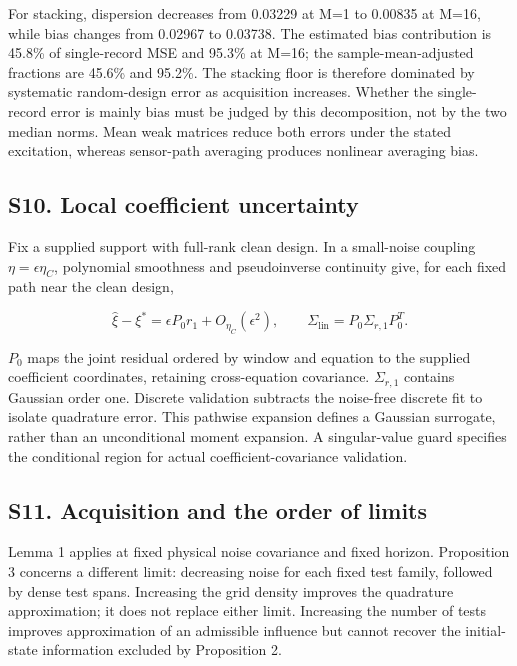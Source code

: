 \documentclass[
  american,
  11pt,
]{article}
\begin{document}
For stacking, dispersion decreases from 0.03229 at M=1 to 0.00835 at
M=16, while bias changes from 0.02967 to 0.03738. The estimated bias
contribution is 45.8\% of single-record MSE and 95.3\% at M=16; the
sample-mean-adjusted fractions are 45.6\% and 95.2\%. The stacking floor
is therefore dominated by systematic random-design error as acquisition
increases. Whether the single-record error is mainly bias must be judged
by this decomposition, not by the two median norms. Mean weak matrices
reduce both errors under the stated excitation, whereas sensor-path
averaging produces nonlinear averaging bias.

\subsection{S10. Local coefficient
uncertainty}\label{s10.-local-coefficient-uncertainty}

Fix a supplied support with full-rank clean design. In a small-noise
coupling \(\eta=\epsilon\eta_C\), polynomial smoothness and
pseudoinverse continuity give, for each fixed path near the clean
design,

\[
\widehat\xi-\xi^*=\epsilon P_0r_1+O_{\eta_C}(\epsilon^2),\qquad
\Sigma_{\mathrm{lin}}=P_0\Sigma_{r,1}P_0^T.
\]

\(P_0\) maps the joint residual ordered by window and equation to the
supplied coefficient coordinates, retaining cross-equation covariance.
\(\Sigma_{r,1}\) contains Gaussian order one. Discrete validation
subtracts the noise-free discrete fit to isolate quadrature error. This
pathwise expansion defines a Gaussian surrogate, rather than an
unconditional moment expansion. A singular-value guard specifies the
conditional region for actual coefficient-covariance validation.

\subsection{S11. Acquisition and the order of
limits}\label{s11.-acquisition-and-the-order-of-limits}

Lemma 1 applies at fixed physical noise covariance and fixed horizon.
Proposition 3 concerns a different limit: decreasing noise for each
fixed test family, followed by dense test spans. Increasing the grid
density improves the quadrature approximation; it does not replace
either limit. Increasing the number of tests improves approximation of
an admissible influence but cannot recover the initial-state information
excluded by Proposition 2.
\end{document}
